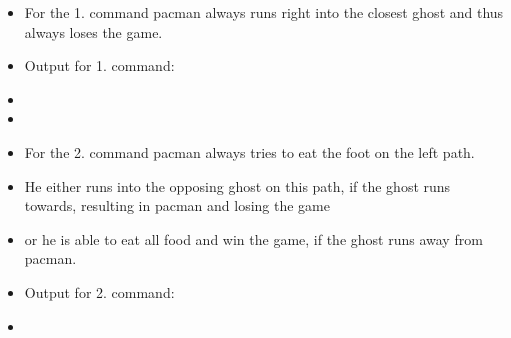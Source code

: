 \begin{itemize}
    \item For the 1. command pacman always runs right into the closest ghost and thus always loses the game.
    \item Output for 1. command:
    \item[] 
    \item[]
    \item For the 2. command pacman always tries to eat the foot on the left path. 
    \item He either runs into the opposing ghost on this path, if the ghost runs towards, resulting in pacman and losing the game
    \item or he is able to eat all food and win the game, if the ghost runs away from pacman.
    \item Output for 2. command:
    \item[] 
\end{itemize}


\newpage
